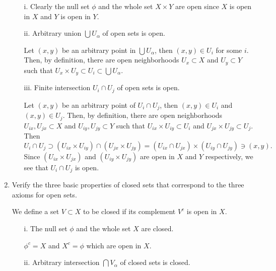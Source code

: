 \documentclass[12pt]{article}
\begin{document}
\begin{enumerate}
\begin{mybox}
  \setlength{\parskip}{3mm}
  \begin{enumerate}
    \item[i.] Clearly the null set $\phi$ and the whole set
      $X\times Y$ are open since $X$ is open in $X$ and
      $Y$ is open in $Y$.

    \item[ii.] Arbitrary union $\bigcup
    {U_\alpha}$ of open sets is open.
    
    \setlength{\parskip}{2mm}
    Let $(x,y)$ be an
    arbitrary point in $\bigcup{U_\alpha}$, then
    $(x,y)\in U_i$ for some $i$. Then, by definition,
    there are open neighborhoods $U_x
    \subset X$ and $U_y\subset Y$ such that
    $U_x\times U_y\subset U_i \subset \bigcup{U_\alpha}$.

    \item[iii.] Finite intersection $U_i\cap U_j$ of
      open sets is open.
      
      \setlength{\parskip}{2mm}
      Let $(x,y)$ be an arbitrary
      point of $U_i\cap U_j$, then $(x,y)\in U_i$ and
      $(x,y)\in U_j$. Then, by definition,
      there are open neighborhoods $U_{ix}, U_{jx}
      \subset X$ and $U_{iy}, U_{jy}\subset Y$ such that
      $U_{ix}\times U_{iy}\subset U_i$ and
      $U_{jx}\times U_{jy}\subset U_j$. Then
      $$U_i\cap U_j
      \supset \left(U_{ix}\times U_{iy}\right)
      \cap\left(U_{jx}\times U_{jy}\right)
      =\left(U_{ix}\cap U_{jx}\right)
      \times\left(U_{iy}\cap U_{jy}\right)
      \ni (x,y).$$
      Since $\left(U_{ix}\times U_{jx}\right)$
      and $\left(U_{iy}\times U_{jy}\right)$ are open
      in $X$ and $Y$ respectively, we see that
      $U_i \cap U_j$ is open.

  \end{enumerate}
\end{mybox}

    
\item Verify the three basic properties of closed sets
that correspond to the three axioms for open sets.
  
\begin{mybox}
  
  We define a set $V\subset X$ to be closed if its
  complement $V^c$ is open in $X$.

  \setlength{\parskip}{2mm}
  \begin{enumerate}
    \item[i.] The null set $\phi$ and the whole set
      $X$ are closed.

      \setlength{\parskip}{2mm}
      $\phi^c=X$ and $X^c=\phi$ which are open in $X$.
    \item[ii.] Arbitrary intersection $\bigcap{V_\alpha}$
      of closed sets is closed.


\end{enumerate}
\end{mybox}
\end{enumerate}
\end{document}

